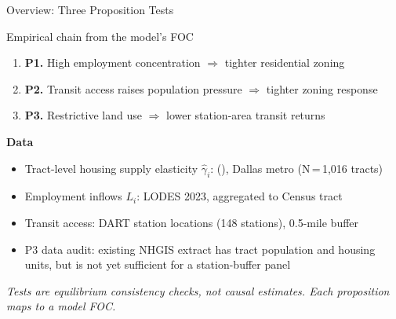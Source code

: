 \documentclass[10pt]{beamer}
\begin{document}
\begin{frame}{Overview: Three Proposition Tests}

\begin{block}{Empirical chain from the model's FOC}
\begin{enumerate}
  \item \textbf{P1.} High employment concentration $\Rightarrow$ tighter residential zoning
  \item \textbf{P2.} Transit access raises population pressure $\Rightarrow$ tighter zoning response
  \item \textbf{P3.} Restrictive land use $\Rightarrow$ lower station-area transit returns
\end{enumerate}
\end{block}

\vspace{0.3cm}
\textbf{Data}
\begin{itemize}
  \item Tract-level housing supply elasticity $\hat{\gamma}_i$: \citeauthor{Baum-Snow2024-ii} (\citeyear{Baum-Snow2024-ii}), Dallas metro (N\,=\,1,016 tracts)
  \item Employment inflows $L_i$: LODES 2023, aggregated to Census tract
  \item Transit access: DART station locations (148 stations), 0.5-mile buffer
  \item P3 data audit: existing NHGIS extract has tract population and housing units,
        but is not yet sufficient for a station-buffer panel
\end{itemize}

\vspace{0.2cm}
\small\textit{Tests are equilibrium consistency checks, not causal estimates.
              Each proposition maps to a model FOC.}
\end{frame}
\end{document}
